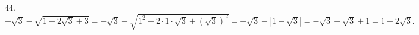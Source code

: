 44. $-\sqrt{3}-\sqrt{1-2\sqrt{3}+3}=-\sqrt{3}-\sqrt{1^2-2\cdot1\cdot\sqrt{3}+(\sqrt{3})^2}=-\sqrt{3}-|1-\sqrt{3}|=-\sqrt{3}-\sqrt{3}+1=1-2\sqrt{3}.$\\
